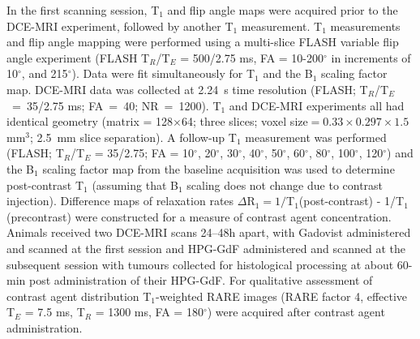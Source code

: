 In the first scanning session, T$_1$ and flip angle maps were acquired prior to the \acs{DCE-MRI} experiment, followed by another T$_1$ measurement.
T$_1$ measurements and flip angle mapping were performed using a multi-slice FLASH variable flip angle experiment (FLASH T$_R$/T$_E$ = 500/2.75 ms, FA = 10-200$^{\circ}$ in increments of 10$^{\circ}$, and 215$^{\circ}$).
Data were fit simultaneously for T$_1$ and the B$_1$ scaling factor map.
\acs{DCE-MRI} data was collected at 2.24~s time resolution (FLASH; T$_R$/T$_E$~=~35/2.75 ms; FA~=~40; NR~=~1200).
T$_1$ and \acs{DCE-MRI} experiments all had identical geometry (matrix = 128$\times$64; three slices; voxel size$=0.33\times 0.297\times 1.5$ mm$^3$; 2.5~mm slice separation).
A follow-up T$_1$ measurement was performed (FLASH; T$_R$/T$_E$ = 35/2.75; FA = 10$^{\circ}$, 20$^{\circ}$, 30$^{\circ}$, 40$^{\circ}$, 50$^{\circ}$, 60$^{\circ}$, 80$^{\circ}$, 100$^{\circ}$, 120$^{\circ}$) and the B$_1$ scaling factor map from the baseline acquisition was used to determine post-contrast T$_1$ (assuming that B$_1$ scaling does not change due to contrast injection).
Difference maps of relaxation rates $\Delta$R$_1=1/$T$_1$(post-contrast) - 1/T$_1$(precontrast) were constructed for a measure of contrast agent concentration.
Animals received two \acs{DCE-MRI} scans 24--48h apart, with Gadovist administered and scanned at the first session and \acs{HPG-GdF} administered and scanned at the subsequent session with tumours collected for histological processing at about 60-min post administration of their \acs{HPG-GdF}.
For qualitative assessment of contrast agent distribution  T$_1$-weighted \acs{RARE} images (RARE factor 4, effective T$_E$ = 7.5 ms, T$_R$ = 1300 ms, FA = 180$^{\circ}$) were acquired after contrast agent administration.

